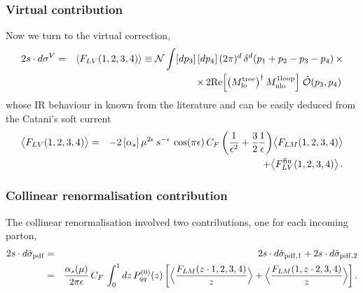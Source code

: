 \documentclass[12pt,a4paper]{article}
\newcommand{\nn}{\nonumber}
\newcommand{\eps}{\epsilon}
\newcommand{\beq}{\begin{eqnarray}}
\newcommand{\eeq}{\end{eqnarray}}
\begin{document}
\subsubsection{Virtual contribution}
Now we turn to the virtual correction, 
\beq
2s\cdot d\sigma^{V} &=&
 \langle F_{LV} (1,2,3,4) \rangle
\equiv 
\mathcal{N} \int [dp_3] \, [dp_4] \,(2\pi)^{d} \, \delta^d(p_1+p_2-p_3-p_4) \, \times
\nn \\
&&
\times \, 2 {\rm Re} \Big[
 \big(M_{\rm lo}^{\rm tree}\big)^{\dagger}
\, M_{\rm nlo}^{\rm 1loop}
\Big] \;
\hat{\mathcal{O}}(p_3, p_4) \, 
\eeq
whose IR behaviour in known from the literature and can be easily deduced from the Catani's soft current
\beq
\big\langle F_{LV}(1,2,3,4) \big\rangle
&=&
 -2 \, [\alpha_{s}]\, \mu^{2\eps} \,s^{-\eps} \, \cos(\pi \eps)\, C_{F} \, \bigg( \frac1{\eps^{2}}+\frac32 \frac1\eps\bigg) 
 \big\langle F_{LM} (1,2,3,4) \big\rangle
 \nn \\
 &&
+\big\langle F_{LV}^{\rm fin} (1,2,3,4) \big\rangle \, .
\eeq

\subsubsection{Collinear renormalisation contribution}
The collinear renormalisation involved two contributions, one for each incoming parton,
\beq
2s \cdot d\hat{\sigma}_{\rm pdf} &=&
 2s \cdot d\hat{\sigma}_{\rm pdf, 1}+2s \cdot d\hat{\sigma}_{\rm pdf, 2} 
 \nn \\
 &=&
\frac{\alpha_s(\mu)}{2\pi \eps} \, C_F \, 
\int_{0}^{1}dz \, 
 P_{qq}^{(0)} (z) \, \bigg[
\Big\langle \frac{F_{LM}(z \cdot 1, 2,3,4)}{z} \Big\rangle
+
\Big\langle \frac{F_{LM}(1, z \cdot  2,3,4)}{z} \Big\rangle
 \bigg] \, .
 \nn \\
 \eeq
\end{document}
